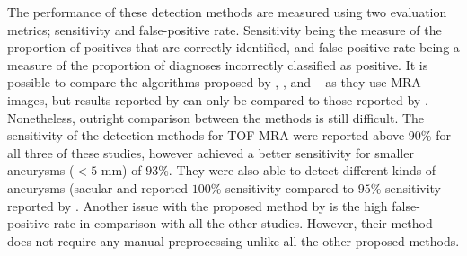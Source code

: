 The performance of these detection methods are measured using two evaluation metrics; sensitivity and false-positive rate. Sensitivity being the measure of the proportion of positives that are correctly identified, and false-positive rate being a measure of the proportion of diagnoses incorrectly classified as positive. It is possible to compare the algorithms proposed by \citeauthor{Hentschke2014}, \citeauthor{Suniaga2012}, and \citeauthor{Yang2011} -- as they use MRA images, but results reported by \citeauthor{Lauric2010} can only be compared to those reported by \citeauthor{Hentschke2014}. Nonetheless, outright comparison between the methods is still difficult. The sensitivity of the detection methods for TOF-MRA were reported above $90\%$ for all three of these studies, however \citeauthor{Hentschke2014} achieved a better sensitivity for smaller aneurysms ($< 5$ mm) of $93\%$. They were also able to detect different kinds of aneurysms (sacular and\citeauthor{Lauric2010} reported $100\%$ sensitivity compared to $95\%$ sensitivity reported by \citeauthor{Hentschke2014}. Another issue with the proposed method by \citeauthor{Hentschke2014} is the high false-positive rate in comparison with all the other studies. However, their method does not require any manual preprocessing unlike all the other proposed methods.

